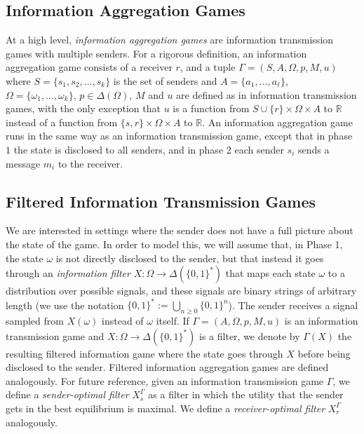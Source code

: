 \documentclass[submission,copyright,creativecommons]{eptcs}
\begin{document}
\subsection{Information Aggregation Games}

At a high level, \emph{information aggregation games} are information transmission games with multiple senders. For a rigorous definition, an information aggregation game consists of a receiver $r$, and a tuple $\Gamma = (S, A, \Omega, p, M, u)$ where $S = \{s_1,s_2,\ldots,s_k\}$ is the set of senders and $A = \{a_1, \ldots, a_\ell\}$, $\Omega = \{\omega_1, \ldots, \omega_k\}$, $p \in \Delta(\Omega)$, $M$ and $u$ are defined as in information transmission games, with the only exception that $u$ is a function from $S \cup \{r\} \times \Omega \times A$ to $\mathbb{R}$ instead of a function from $\{s, r\} \times \Omega \times A$ to $\mathbb{R}$. An information aggregation game runs in the same way as an information transmission game, except that in phase $1$ the state is disclosed to all senders, and in phase 2 each sender $s_i$ sends a message $m_i$ to the receiver.

\subsection{Filtered Information Transmission Games}

We are interested in settings where the sender does not have a full picture about the state of the game. In order to model this, we will assume that, in Phase 1, the state $\omega$ is not directly disclosed to the sender, but that instead it goes through an \emph{information filter} $X: \Omega \to \Delta(\{0,1\}^*)$ that maps each state $\omega$ to a distribution over possible signals, and these signals are binary strings of arbitrary length (we use the notation $\{0,1\}^* := \bigcup_{n \ge 0} \{0,1\}^n$). The sender receives a signal sampled from $X(\omega)$ instead of $\omega$ itself. If $\Gamma = (A, \Omega, p, M, u)$ is an information transmission game and $X: \Omega \to \Delta(\{0,1\}^*)$ is a filter, we denote by $\Gamma(X)$ the resulting filtered information game where the state goes through $X$ before being disclosed to the sender. Filtered information aggregation games are defined analogously. For future reference, given an information transmission game $\Gamma$, we define a \emph{sender-optimal filter} $X_s^\Gamma$ as a filter in which the utility that the sender gets in the best equilibrium is maximal. We define a \emph{receiver-optimal filter} $X_r^\Gamma$ analogously. 
\end{document}
